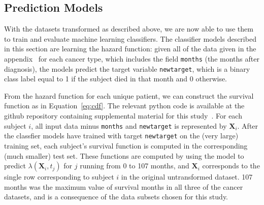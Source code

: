 \documentclass[10pt,letterpaper]{article}
\newcommand{\codewhite}[1]{\colorbox{white}{\texttt{#1}}}
\begin{document}
\subsection*{Prediction Models}
\label{sec:predmodels}

With the datasets transformed as described above, we are now able to use them to train and evaluate machine learning classifiers.
The classifier models described in this section are learning the hazard function: given all of the data given in the appendix~ for each cancer type, which includes the field \codewhite{months} (the months after diagnosis), the models predict the target variable \codewhite{newtarget}, which is a binary class label equal to 1 if the subject died in that month and 0 otherwise.


From the hazard function for each unique patient, we can construct the
survival function as in Equation~\ref{eq:cdf}.
The relevant python code is available at the github repository containing supplemental material for this study~\cite{supp}.
For each subject $i$, all input data minus \codewhite{months} and \codewhite{newtarget} is represented by $\mathbf{X}_{i}$. After the classfier models have trained with target \codewhite{newtarget} on the (very large) training set, each subject's survival function is computed in the corresponding (much smaller) test set.
These functions are computed by using the model to predict $\lambda(\mathbf{X}_i, t_{j})$ for $j$ running from 0 to 107 months, and $\mathbf{X}_{i}$ corresponds to the single row corresponding to subject $i$ in the original untransformed dataset.
107 months was the maximum value of survival months in all three of the cancer datasets, and is a consequence of the data subsets chosen for this study.
\end{document}
